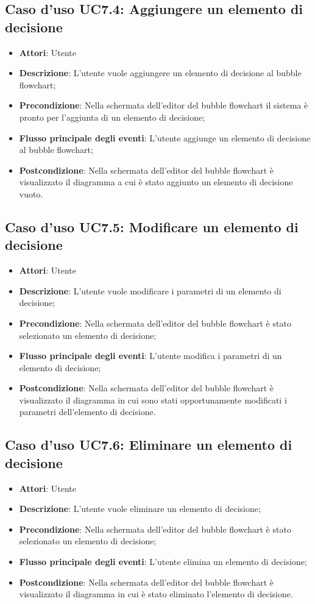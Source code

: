 \documentclass[../AnalisiDeiRequisiti.tex]{subfiles}
\begin{document}
				\subsection{Caso d'uso UC7.4: Aggiungere un elemento di decisione}
				\begin{itemize}
					\item \textbf{Attori}: Utente
					\item \textbf{Descrizione}: L'utente vuole aggiungere un elemento di decisione al bubble flowchart;
					\item \textbf{Precondizione}: Nella schermata dell'editor del bubble flowchart il sistema è pronto per l'aggiunta di un elemento di decisione;
					\item \textbf{Flusso principale degli eventi}: L'utente aggiunge un elemento di decisione al bubble flowchart;
					\item \textbf{Postcondizione}: Nella schermata dell'editor del bubble flowchart è visualizzato il diagramma a cui è stato aggiunto un elemento di decisione vuoto.
				\end{itemize}
				\subsection{Caso d'uso UC7.5: Modificare un elemento di decisione}
				\begin{itemize}
					\item \textbf{Attori}: Utente
					\item \textbf{Descrizione}: L'utente vuole modificare i parametri di un elemento di decisione;
					\item \textbf{Precondizione}: Nella schermata dell'editor del bubble flowchart è stato selezionato un elemento di decisione;
					\item \textbf{Flusso principale degli eventi}: L'utente modifica i parametri di un elemento di decisione;
					\item \textbf{Postcondizione}: Nella schermata dell'editor del bubble flowchart è visualizzato il diagramma in cui sono stati opportunamente modificati i parametri dell'elemento di decisione.
				\end{itemize}
				\subsection{Caso d'uso UC7.6: Eliminare un elemento di decisione}
				\begin{itemize}
					\item \textbf{Attori}: Utente
					\item \textbf{Descrizione}: L'utente vuole eliminare un elemento di decisione;
					\item \textbf{Precondizione}: Nella schermata dell'editor del bubble flowchart è stato selezionato un elemento di decisione;
					\item \textbf{Flusso principale degli eventi}: L'utente elimina un elemento di decisione;
					\item \textbf{Postcondizione}: Nella schermata dell'editor del bubble flowchart è visualizzato il diagramma in cui è stato eliminato l'elemento di decisione.
				\end{itemize}
\end{document}
